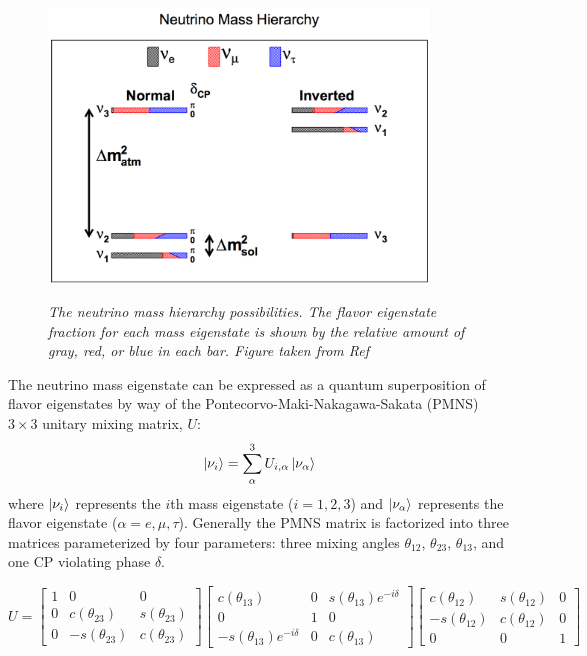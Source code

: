 \begin{figure}[ht!]
\centering
	\includegraphics[width=0.9\textwidth]{Figures/nu_hierarchy_fig.png} \\
\caption{\textit{The neutrino mass hierarchy possibilities. The flavor eigenstate fraction for each mass eigenstate is shown by the relative amount of gray, red, or blue in each bar. Figure taken from Ref \protect\cite{HierarchyFigsource}}}\label{nu_hierarchy_fig}
\end{figure}

The neutrino mass eigenstate can be expressed as a quantum superposition of flavor eigenstates by way of the Pontecorvo-Maki-Nakagawa-Sakata (PMNS) $3\times3$ unitary mixing matrix, $U$:
\begin{equation}\label{nuPMNSmixeqtn}
\Ket{\nu_i} = \sum_\alpha^3 U_{i,\alpha}\Ket{\nu_\alpha}
\end{equation}
where $\Ket{\nu_i}$ represents the $i$th mass eigenstate ($i=1,2,3$) and $\Ket{\nu_\alpha}$ represents the flavor eigenstate ($\alpha=e,\mu,\tau$). Generally the PMNS matrix is factorized into three matrices parameterized by four parameters: three mixing angles $\theta_{12}$, $\theta_{23}$, $\theta_{13}$, and one CP violating phase $\delta$.

\begin{equation}\label{PMNSfactorized}
U = \begin{bmatrix} 1 & 0 & 0 \\ 0 & c(\theta_{23}) & s(\theta_{23}) \\ 0 & -s(\theta_{23}) & c(\theta_{23}) \end{bmatrix} 
\begin{bmatrix} c(\theta_{13}) & 0 & s(\theta_{13})e^{-i\delta} \\ 0 & 1 & 0 \\ -s(\theta_{13})e^{-i\delta} & 0 & c(\theta_{13}) \end{bmatrix} 
\begin{bmatrix} c(\theta_{12}) & s(\theta_{12}) & 0 \\ -s(\theta_{12}) & c(\theta_{12}) & 0 \\ 0 & 0 & 1 \end{bmatrix} 
\end{equation}

